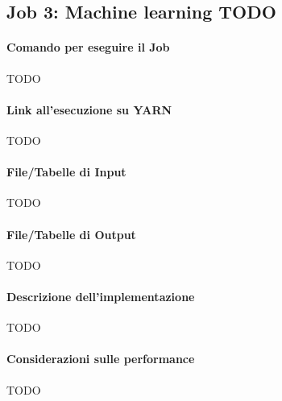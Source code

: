 

\subsection[%
    Job 3: Machine learning%
  ]{%
    Job 3: Machine learning TODO%
  }\label{subsec:job3}

  \paragraph{Comando per eseguire il Job}\label{par:job3:cmd}

  TODO

  \paragraph{Link all’esecuzione su YARN}\label{par:job3:yarn}

  TODO

  \paragraph{File/Tabelle di Input}\label{par:job3:input}

  TODO

  \paragraph{File/Tabelle di Output}\label{par:job3:output}

  TODO

  \paragraph{Descrizione dell’implementazione}\label{par:job3:implementation}

  TODO

  \paragraph{Considerazioni sulle performance}\label{par:job3:performance}

  TODO
